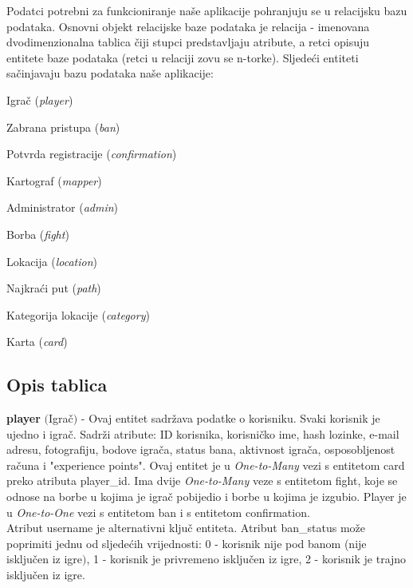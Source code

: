 			Podatci potrebni za funkcioniranje naše aplikacije pohranjuju se u relacijsku bazu podataka. Osnovni objekt relacijske baze podataka je relacija - imenovana dvodimenzionalna tablica čiji stupci predstavljaju atribute, a retci opisuju entitete baze podataka (retci u relaciji zovu se n-torke).
			Sljedeći entiteti sačinjavaju bazu podataka naše aplikacije:
			\begin{packed_item}
				\item Igrač (\textit{player})
				\item Zabrana pristupa (\textit{ban})
				\item Potvrda registracije (\textit{confirmation})
				\item Kartograf (\textit{mapper})
				\item Administrator (\textit{admin})
				\item Borba (\textit{fight})
				\item Lokacija (\textit{location})
				\item Najkraći put (\textit{path})
				\item Kategorija lokacije (\textit{category})
				\item Karta (\textit{card})
			\end{packed_item}
			
			\subsection{Opis tablica}
			
				\noindent\textbf{player} $($Igrač$)$ - Ovaj entitet sadržava podatke o korisniku. Svaki korisnik je ujedno i igrač. Sadrži atribute: ID korisnika, korisničko ime, hash lozinke, e-mail adresu, fotografiju, bodove igrača, status bana, aktivnost igrača, osposobljenost računa i "experience points". Ovaj entitet je u \textit{One-to-Many} vezi s entitetom card preko atributa player\_id. Ima dvije \textit{One-to-Many} veze s entitetom fight, koje se odnose na borbe u kojima je igrač pobijedio i borbe u kojima je izgubio. Player je u \textit{One-to-One} vezi s entitetom ban i s entitetom confirmation. \\
				
				Atribut username je alternativni ključ entiteta. Atribut ban\_status može poprimiti jednu od sljedećih vrijednosti: 0 - korisnik nije pod banom (nije isključen iz igre$)$, 1 - korisnik je privremeno isključen iz igre, 2 - korisnik je trajno isključen iz igre.
				

